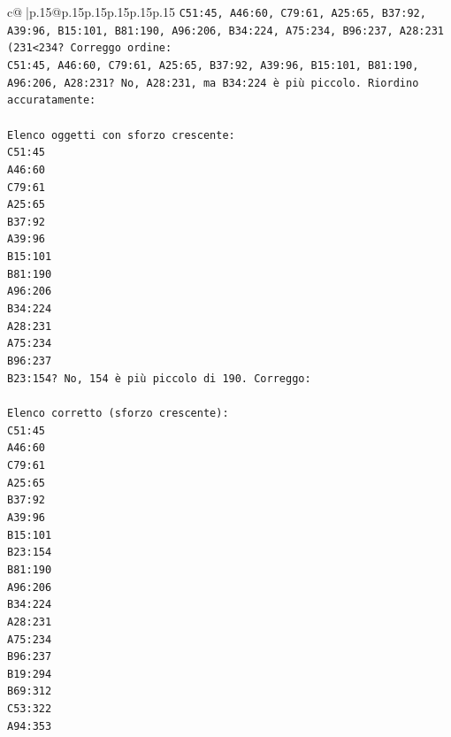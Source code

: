 \documentclass{article}
\begin{document}
{\begin{supertabular}{c@{$\;$}|p{.15\linewidth}@{}p{.15\linewidth}p{.15\linewidth}p{.15\linewidth}p{.15\linewidth}p{.15\linewidth}}
{{{\texttt{C51:45, A46:60, C79:61, A25:65, B37:92, A39:96, B15:101, B81:190, A96:206, B34:224, A75:234, B96:237, A28:231 (231<234? Correggo ordine: } \\
\texttt{C51:45, A46:60, C79:61, A25:65, B37:92, A39:96, B15:101, B81:190, A96:206, A28:231? No, A28:231, ma B34:224 è più piccolo. Riordino accuratamente:} \\
\\ 
\texttt{Elenco oggetti con sforzo crescente:} \\
\texttt{C51:45} \\
\texttt{A46:60} \\
\texttt{C79:61} \\
\texttt{A25:65} \\
\texttt{B37:92} \\
\texttt{A39:96} \\
\texttt{B15:101} \\
\texttt{B81:190} \\
\texttt{A96:206} \\
\texttt{B34:224} \\
\texttt{A28:231} \\
\texttt{A75:234} \\
\texttt{B96:237} \\
\texttt{B23:154? No, 154 è più piccolo di 190. Correggo:} \\
\\ 
\texttt{Elenco corretto (sforzo crescente):} \\
\texttt{C51:45} \\
\texttt{A46:60} \\
\texttt{C79:61} \\
\texttt{A25:65} \\
\texttt{B37:92} \\
\texttt{A39:96} \\
\texttt{B15:101} \\
\texttt{B23:154} \\
\texttt{B81:190} \\
\texttt{A96:206} \\
\texttt{B34:224} \\
\texttt{A28:231} \\
\texttt{A75:234} \\
\texttt{B96:237} \\
\texttt{B19:294} \\
\texttt{B69:312} \\
\texttt{C53:322} \\
\texttt{A94:353} \\
}}}
\end{supertabular}}
\end{document}

